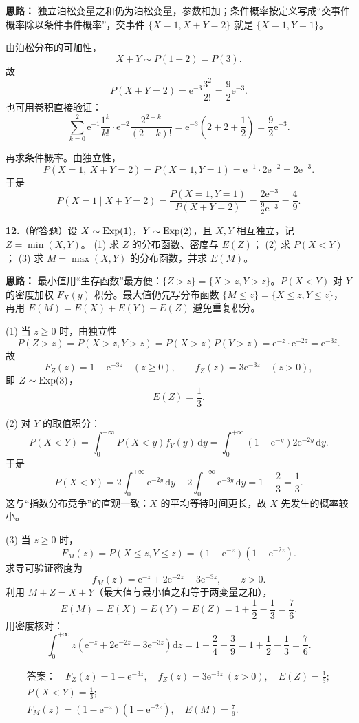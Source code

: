 \ifshowsolutions%
\textbf{思路：} 独立泊松变量之和仍为泊松变量，参数相加；条件概率按定义写成“交事件概率除以条件事件概率”，交事件 $\{X=1,X+Y=2\}$ 就是 $\{X=1,Y=1\}$。

由泊松分布的可加性，
\[
X+Y\sim P(1+2)=P(3).
\]
故
\[
P(X+Y=2)=\mathrm e^{-3}\frac{3^2}{2!}=\frac{9}{2}\mathrm e^{-3}.
\]
也可用卷积直接验证：
\[
\sum_{k=0}^{2}\mathrm e^{-1}\frac{1^k}{k!}\cdot
\mathrm e^{-2}\frac{2^{2-k}}{(2-k)!}
=\mathrm e^{-3}\left(2+2+\frac12\right)
=\frac92\mathrm e^{-3}.
\]

再求条件概率。由独立性，
\[
P(X=1,\ X+Y=2)=P(X=1,Y=1)
=\mathrm e^{-1}\cdot 2\mathrm e^{-2}=2\mathrm e^{-3}.
\]
于是
\[
P(X=1\mid X+Y=2)
=\frac{P(X=1,Y=1)}{P(X+Y=2)}
=\frac{2\mathrm e^{-3}}{\frac92\mathrm e^{-3}}
=\frac49.
\]


\else \answerarea[8] \fi%
\textbf{12.}（解答题）设 $X\sim \operatorname{Exp}(1)$，$Y\sim \operatorname{Exp}(2)$，且 $X,Y$ 相互独立，记 $Z=\min(X,Y)$。
(1) 求 $Z$ 的分布函数、密度与 $E(Z)$；
(2) 求 $P(X<Y)$；
(3) 求 $M=\max(X,Y)$ 的分布函数，并求 $E(M)$。

\ifshowsolutions%
\textbf{思路：} 最小值用“生存函数”最方便：$\{Z>z\}=\{X>z,Y>z\}$。$P(X<Y)$ 对 $Y$ 的密度加权 $F_X(y)$ 积分。最大值仍先写分布函数 $\{M\leq z\}=\{X\leq z,Y\leq z\}$，再用 $E(M)=E(X)+E(Y)-E(Z)$ 避免重复积分。

(1) 当 $z\geq0$ 时，由独立性
\[
P(Z>z)=P(X>z,Y>z)=P(X>z)P(Y>z)
=\mathrm e^{-z}\cdot\mathrm e^{-2z}=\mathrm e^{-3z}.
\]
故
\[
F_Z(z)=1-\mathrm e^{-3z}\quad(z\geq0),\qquad f_Z(z)=3\mathrm e^{-3z}\quad(z>0),
\]
即 $Z\sim \operatorname{Exp}(3)$，
\[
E(Z)=\frac13.
\]

(2) 对 $Y$ 的取值积分：
\[
P(X<Y)=\int_0^{+\infty}P(X<y)f_Y(y)\,\mathrm dy
=\int_0^{+\infty}\left(1-\mathrm e^{-y}\right)2\mathrm e^{-2y}\,\mathrm dy.
\]
于是
\[
P(X<Y)=2\int_0^{+\infty}\mathrm e^{-2y}\,\mathrm dy
-2\int_0^{+\infty}\mathrm e^{-3y}\,\mathrm dy
=1-\frac23=\frac13.
\]
这与“指数分布竞争”的直观一致：$X$ 的平均等待时间更长，故 $X$ 先发生的概率较小。

(3) 当 $z\geq0$ 时，
\[
F_M(z)=P(X\leq z,Y\leq z)
=\left(1-\mathrm e^{-z}\right)\left(1-\mathrm e^{-2z}\right).
\]
求导可验证密度为
\[
f_M(z)=\mathrm e^{-z}+2\mathrm e^{-2z}-3\mathrm e^{-3z},\qquad z>0.
\]
利用 $M+Z=X+Y$（最大值与最小值之和等于两变量之和），
\[
E(M)=E(X)+E(Y)-E(Z)
=1+\frac12-\frac13=\frac76.
\]
用密度核对：
\[
\int_0^{+\infty}z\left(\mathrm e^{-z}+2\mathrm e^{-2z}-3\mathrm e^{-3z}\right)\mathrm dz
=1+\frac{2}{4}-\frac{3}{9}
=1+\frac12-\frac13=\frac76.
\]

\[
\boxed{\begin{gathered}
\textbf{答案：}\quad F_Z(z)=1-\mathrm e^{-3z},\quad f_Z(z)=3\mathrm e^{-3z}\ (z>0),\quad E(Z)=\frac13;\\
P(X<Y)=\frac13;\\
F_M(z)=\left(1-\mathrm e^{-z}\right)\left(1-\mathrm e^{-2z}\right),\quad E(M)=\frac76.
\end{gathered}}
\]

\else \answerarea[10] \fi%

